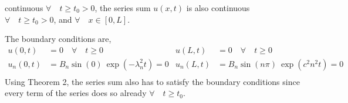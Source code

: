 \begin{enumerate}
          continuous $ \forall\quad  t \geq t_0 > 0 $, the series sum $ u(x, t) $ is also
          continuous $ \forall\quad  t \geq t_0 > 0 $, and $ \forall \quad x \in [0,L] $.
          \par
          The boundary conditions are,
          \begin{align}
              u(0, t)   & = 0 \quad \forall\quad t \geq 0         &
              u(L, t)   & = 0 \quad \forall\quad t \geq 0           \\
              u_n(0, t) & = B_n \sin(0)\ \exp(-\lambda_n^2 t) = 0 &
              u_n(L, t) & = B_n \sin(n\pi)\ \exp(c^2n^2 t) = 0      \\
          \end{align}
          Using Theorem 2, the series sum also has to satisfy the boundary conditions
          since every term of the series does so already $ \forall \quad t \geq t_0 $.


\end{enumerate}
